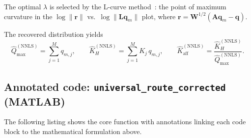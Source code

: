 \documentclass[12pt]{article}
\begin{document}
The optimal $\lambda$ is selected by the L-curve
method~\cite{Cernik1995}: the point of maximum curvature in the
$\log\|\mathbf{r}\|$ vs.\ $\log\|\mathbf{L}\mathbf{q}_m\|$ plot,
where $\mathbf{r} = \mathbf{W}^{1/2}(\mathbf{A}\mathbf{q}_m
- \mathbf{q})$.

The recovered distribution yields
\begin{equation}
  \widehat{Q}_{\max}^{\mathrm{(NNLS)}} = \sum_{j=1}^{M} q_{m,j},
  \qquad
  \widehat{K}_H^{\mathrm{(NNLS)}} = \sum_{j=1}^{M} K_j\, q_{m,j},
  \qquad
  \widehat{K}_{\mathrm{aff}}^{\mathrm{(NNLS)}}
  = \frac{\widehat{K}_H^{\mathrm{(NNLS)}}}
         {\widehat{Q}_{\max}^{\mathrm{(NNLS)}}}.
\end{equation}

\subsection{Annotated code: \texttt{universal\_route\_corrected} (MATLAB)}

The following listing shows the core function with annotations
linking each code block to the mathematical formulation above.
\end{document}
